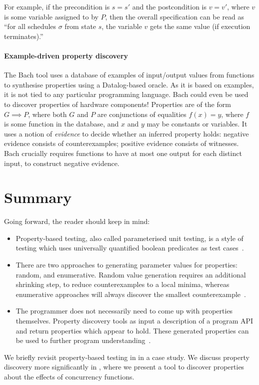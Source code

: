 \noindent
For example, if the precondition is $s = s'$ and the postcondition is
$v = v'$, where $v$ is some variable assigned to by $P$, then the
overall specification can be read as ``for all schedules $\sigma$ from
state $s$, the variable $v$ gets the same value (if execution
terminates).''

\paragraph{Example-driven property discovery}
The Bach\cite{smith2017} tool uses a database of examples of
input/output values from functions to synthesise properties using a
Datalog-based oracle.  As it is based on examples, it is not tied to
any particular programming language.  Bach could even be used to
discover properties of hardware components!  Properties are of the
form $G \implies P$, where both $G$ and $P$ are conjunctions of
equalities $f(x) = y$, where $f$ is some function in the database, and
$x$ and $y$ may be constants or variables.  It uses a notion of
\emph{evidence} to decide whether an inferred property holds: negative
evidence consists of counterexamples; positive evidence consists of
witnesses.  Bach crucially requires functions to have at most one
output for each distinct input, to construct negative evidence.

\vfill\pagebreak
\section{Summary}

Going forward, the reader should keep in mind:

\begin{itemize}
\item Property-based testing, also called parameterised unit testing,
  is a style of testing which uses universally quantified boolean
  predicates as test cases~.

\item There are two approaches to generating parameter values for
  properties: random, and enumerative.  Random value generation
  requires an additional shrinking step, to reduce counterexamples to
  a local minima, whereas enumerative approaches will always discover
  the smallest counterexample~.

\item The programmer does not necessarily need to come up with
  properties themselves.  Property discovery tools as input a
  description of a program API and return properties which appear to
  hold.  These generated properties can be used to further program
  understanding~.
\end{itemize}

We briefly revisit property-based testing in  in a
case study.  We discuss property discovery more significantly in
, where we present a tool to discover properties about
the effects of concurrency functions.

